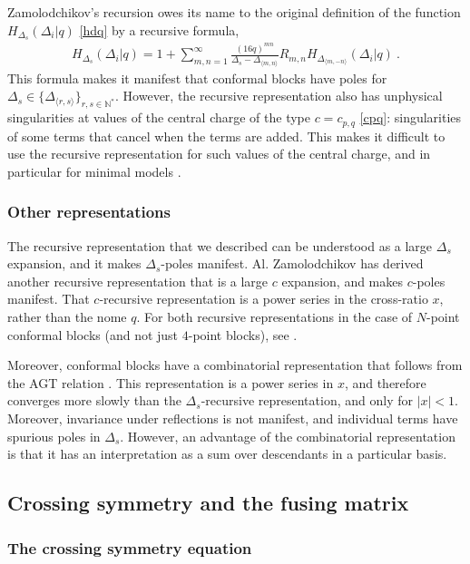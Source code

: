 \documentclass[12pt, a4paper, notitlepage, twoside]{report}
\numberwithin{equation}{section}
\theoremstyle{break}
\begin{document}
Zamolodchikov's recursion owes its name to the original definition of the function $H_{\Delta_s}(\Delta_i|q)$ \eqref{hdq} by a recursive formula,
\begin{align}
 H_{\Delta_s}(\Delta_i|q) = 1 + \sum_{m,n=1}^\infty \frac{(16q)^{mn}}{\Delta_s-\Delta_{\langle m,n\rangle}} R_{m,n} H_{\Delta_{\langle m,-n\rangle}}(\Delta_i|q)\ .
 \label{hrec}
\end{align}
This formula makes it manifest that conformal blocks have poles for $\Delta_s \in \{\Delta_{\langle r,s\rangle}\}_{r,s\in {\mathbb{N}}^*}$. However, the recursive representation also has unphysical singularities at 
values of the central charge of the type $c= c_{p, q}$ \eqref{cpq}: singularities of some terms that cancel when the terms are added. This makes it difficult to use the recursive representation for such values of the central charge, and in particular for minimal models \cite{rib18}.


\subsubsection{Other representations}

The recursive representation that we described can be understood as a large $\Delta_s$ expansion, and it makes $\Delta_s$-poles manifest. Al. Zamolodchikov has derived another recursive representation that is a large $c$ expansion, and makes $c$-poles manifest. That $c$-recursive representation is a power series in the cross-ratio $x$, rather than the nome $q$. For both recursive representations in the case of $N$-point conformal blocks (and not just $4$-point blocks), see \cite{ccy17}.

Moreover, conformal blocks have a combinatorial representation that follows from the AGT relation \cite{aflt10}. 
This representation is a power series in $x$, and therefore converges more slowly than the $\Delta_s$-recursive representation, and only for $|x|<1$.
Moreover, invariance under reflections is not manifest, and individual terms have spurious poles in $\Delta_s$.
However, an advantage of the combinatorial representation is that it has an interpretation as a sum over descendants in a particular basis.


\subsection{Crossing symmetry and the fusing matrix}\label{seccsfm}

\subsubsection{The crossing symmetry equation}
\end{document}
